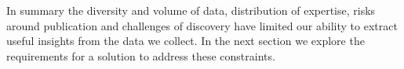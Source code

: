 In summary the diversity and volume of data, distribution of expertise, risks 
around publication and challenges of discovery have limited our ability to 
extract useful insights from the data we collect. In the next section we explore 
the requirements for a solution to address these constraints.











